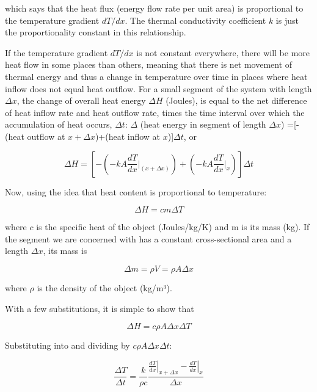 which says that the heat flux (energy flow rate per unit area) is proportional to the temperature gradient $dT/dx$.  The thermal conductivity coefficient $k$ is just the proportionality constant in this relationship.

If the temperature gradient $dT/dx$ is not constant everywhere, there will be more heat flow in some places than others, meaning that there is net movement of thermal energy and thus a change in temperature over time in places where heat inflow does not equal heat outflow.  For a small segment of the system with length $\Delta x$, the change of overall heat energy $\Delta H$ (Joules), is equal to the net difference of heat inflow rate and heat outflow rate, times the time interval over which the accumulation of heat occurs, $\Delta t$:
$\Delta$ (heat energy in segment of length $\Delta x$) =[-(heat outflow at $x+\Delta x$)+(heat inflow at $x$)]$\Delta t$, or

\begin{equation} \label{eq:deltah} 
\Delta H =\left[-\left(-kA \frac{dT}{dx}\bigg\rvert_{(x+\Delta x)}\right)+\left( -kA \frac{dT}{dx}\bigg\rvert_{x}\right)\right]\Delta t
\end{equation}

Now, using the idea that heat content is proportional to temperature: 

\begin{equation} \label{eq:heattransfer} 
\Delta H =cm\Delta T
\end{equation}

where $c$ is the specific heat of the object (Joules/kg/K) and m is its mass (kg).  If the segment we are concerned with has a constant cross-sectional area and a length $\Delta x$, its mass is 
	
\begin{equation} \label{eq:mass} 
\Delta m=\rho V = \rho A \Delta x
\end{equation}

where $\rho$ is the density of the object (kg/m³).

With a few substitutions, it is simple to show that 	

\begin{equation} \label{eq:deltaH2} 
\Delta H =c\rho A\Delta x \Delta T
\end{equation}


Substituting into  and dividing by $c \rho A \Delta x \Delta t$:

\begin{equation} \label{eq:tempgradient} 
\frac{\Delta T}{\Delta t} =\frac{k}{\rho c}\frac{\left. \frac{dT}{dx}\right|_{x+\Delta x}-\left. \frac{dT}{dx}\right|_{x}}{\Delta x}
\end{equation}

